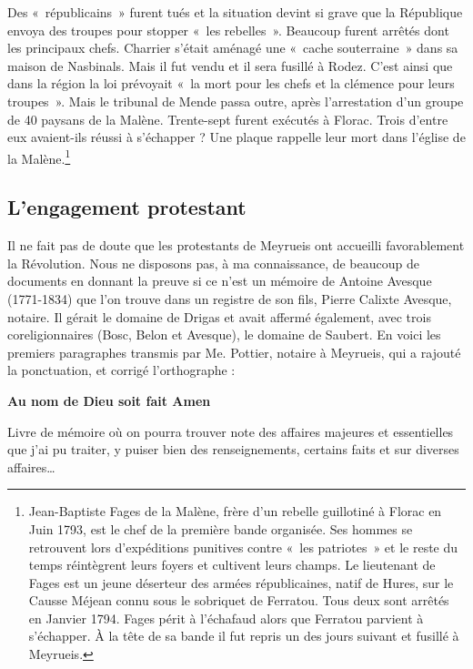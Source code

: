 {Des «~républicains~» furent tués et la situation devint si grave que la République envoya des troupes pour stopper «~les rebelles~». Beaucoup furent arrêtés dont les principaux chefs.
Charrier s’était aménagé une «~cache souterraine~» dans sa maison de Nasbinals. Mais il fut vendu et il sera fusillé à Rodez. C’est ainsi que dans la région la loi prévoyait «~la mort pour les chefs et la clémence pour leurs troupes~». Mais le tribunal de Mende passa outre, après l’arrestation d’un groupe de 40 paysans de la Malène. Trente-sept furent exécutés à Florac. Trois d’entre eux avaient-ils réussi à s’échapper ? Une plaque rappelle leur mort dans l’église de la Malène.\footnote{Jean-Baptiste Fages de la Malène, frère d’un rebelle guillotiné à Florac en Juin 1793, est le chef de la première bande organisée. Ses hommes se retrouvent lors d’expéditions punitives contre «~les patriotes~» et le reste du temps réintègrent leurs foyers et cultivent leurs champs. Le lieutenant de Fages est un jeune déserteur des armées républicaines, natif de Hures, sur le Causse Méjean connu sous le sobriquet de Ferratou. Tous deux sont arrêtés en Janvier 1794. Fages périt à l’échafaud alors que Ferratou parvient à s’échapper. À la tête de sa bande il fut repris un des jours suivant et fusillé à Meyrueis.}



{\fontsize{10.05}{11.45}\selectfont

\subsection{L’engagement protestant}


Il ne fait pas de doute que les protestants de Meyrueis ont accueilli favorablement la
Révolution. Nous ne disposons pas, à ma connaissance, de beaucoup de documents en
donnant la preuve si ce n’est un mémoire de Antoine Avesque (1771-1834) que l’on trouve
dans un registre de son fils, Pierre Calixte Avesque, notaire. Il gérait le domaine de Drigas et
avait affermé également, avec trois coreligionnaires (Bosc, Belon et Avesque), le domaine de
Saubert. En voici les premiers paragraphes transmis par Me. Pottier, notaire à Meyrueis, qui a
rajouté la ponctuation, et corrigé l’orthographe :

\begin{center}
\textbf{Au nom de Dieu soit fait Amen}
\end{center}

Livre de mémoire où on pourra trouver note des affaires majeures et essentielles que j’ai pu traiter, y puiser
bien des renseignements, certains faits et sur diverses affaires…

}}
